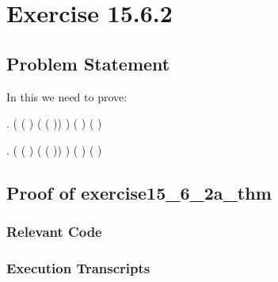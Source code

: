 \documentclass{report}
\begin{document}


 \chapter{Exercise 15.6.2}
 \label{cha:exercise-15.6.2}
  
 \section{Problem Statement}
 \label{sec:problem-statement-2}
In this we need to prove:  

\HOLTokenTurnstile{} \HOLSymConst{\HOLTokenForall{}} .
     ( ( ) (  ( )) \HOLSymConst{=}
       ) \HOLSymConst{\HOLTokenEquiv{}}
     ( \HOLSymConst{=}  ) \HOLSymConst{\HOLTokenConj{}} ( \HOLSymConst{=} )


\HOLTokenTurnstile{} \HOLSymConst{\HOLTokenForall{}} .
     ( ( ) (  ( )) \HOLSymConst{=}
       ) \HOLSymConst{\HOLTokenEquiv{}}
     ( \HOLSymConst{=}  ) \HOLSymConst{\HOLTokenConj{}} ( \HOLSymConst{=} )

\section{Proof of exercise15_6_2a_thm}
\label{sec:proof-2a}

\subsection{Relevant Code}
\label{sec:relevant-code-2a}


\subsection{Execution Transcripts}
\label{sec:exec-transcr-2a}
\end{document}

